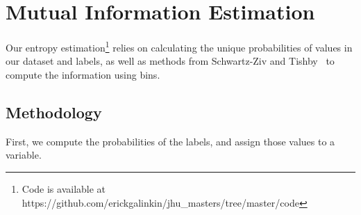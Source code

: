\footnotesize
\renewcommand{\thechapter}{\Roman{chapter}}

\renewcommand{\thesection}{\Alph{section}.}

\chapter{Mutual Information Estimation}
\label{append:two}

Our entropy estimation\footnote{Code is available at https://github.com/erickgalinkin/jhu\_masters/tree/master/code} relies on calculating the unique probabilities of values in our dataset and labels, as well as methods from Schwartz-Ziv and Tishby~\cite{shwartz2017opening} to compute the information using bins. 

\section{Methodology}
First, we compute the probabilities of the labels, and assign those values to a variable.

